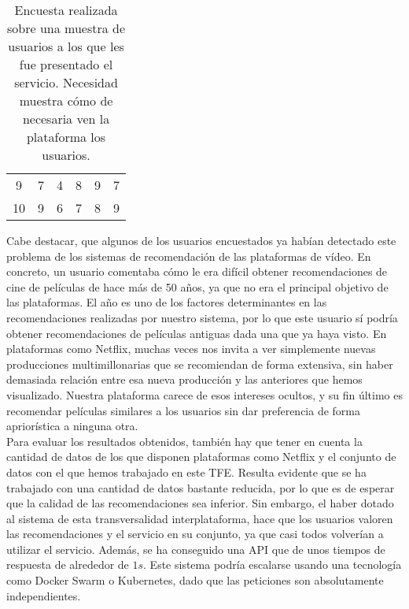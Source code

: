 \begin{table}[H]
{\begin{tabular}{cccccc}
9                                     & 7                                       & 4                                            & 8                                             & 9                                 & 7                                       \\
10                                    & 9                                       & 6                                            & 7                                             & 8                                 & 9                                      
\end{tabular}%
}
\caption{Encuesta realizada sobre una muestra de usuarios a los que les fue presentado el servicio. Necesidad muestra cómo de necesaria ven la plataforma los usuarios.}
\label{tab:satisfaction}
\end{table}

Cabe destacar, que algunos de los usuarios encuestados ya habían detectado este problema de los sistemas de recomendación de las plataformas de vídeo. En concreto, un usuario comentaba cómo le era difícil obtener recomendaciones de cine de películas de hace más de 50 años, ya que no era el principal objetivo de las plataformas. El año es uno de los factores determinantes en las recomendaciones realizadas por nuestro sistema, por lo que este usuario sí podría obtener recomendaciones de películas antiguas dada una que ya haya visto. En plataformas como Netflix, muchas veces nos invita a ver simplemente nuevas producciones multimillonarias que se recomiendan de forma extensiva, sin haber demasiada relación entre esa nueva producción y las anteriores que hemos visualizado. Nuestra plataforma carece de esos intereses ocultos, y su fin último es recomendar películas similares a los usuarios sin dar preferencia de forma apriorística a ninguna otra.\\

Para evaluar los resultados obtenidos, también hay que tener en cuenta la cantidad de datos de los que disponen plataformas como Netflix y el conjunto de datos con el que hemos trabajado en este TFE. Resulta evidente que se ha trabajado con una cantidad de datos bastante reducida, por lo que es de esperar que la calidad de las recomendaciones sea inferior. Sin embargo, el haber dotado al sistema de esta transversalidad interplataforma, hace que los usuarios valoren las recomendaciones y el servicio en su conjunto, ya que casi todos volverían a utilizar el servicio. Además, se ha conseguido una API que de unos tiempos de respuesta de alrededor de $1 s$. Este sistema podría escalarse usando una tecnología como Docker Swarm o Kubernetes, dado que las peticiones son absolutamente independientes.\\


